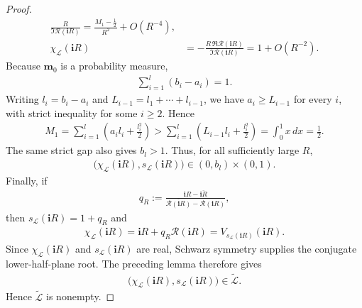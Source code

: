 \documentclass[11pt]{amsart}
\theoremstyle{plain}
\renewcommand\ell{l}
\newcommand\bm{\mathbf{m}}
\numberwithin{equation}{section}
\numberwithin{theorem}{section}
\numberwithin{figure}{section}
\begin{document}
\begin{proof}
\begin{align*}
    \frac{R}{\Im\mathscr R(\mathbf iR)}
    =
    \frac{M_1-\frac12}{R^2}+O(R^{-4}),\\
    \chi_{\mathcal L}(\mathbf iR)
    &=
    -\frac{R\,\Re\mathscr R(\mathbf iR)}
          {\Im\mathscr R(\mathbf iR)}
    =
    1+O(R^{-2}).
\end{align*}
Because $\bm_0$ is a probability measure,
\begin{align*}
    \sum_{i=1}^{l}(b_i-a_i)=1.
\end{align*}
Writing $\ell_i=b_i-a_i$ and
$L_{i-1}=\ell_1+\cdots+\ell_{i-1}$, we have
$a_i\geq L_{i-1}$ for every $i$, with strict inequality for some
$i\geq2$. Hence
\begin{align*}
    M_1
    =
    \sum_{i=1}^{l}
    \left(a_i\ell_i+\frac{\ell_i^2}{2}\right)
    >
    \sum_{i=1}^{l}
    \left(L_{i-1}\ell_i+\frac{\ell_i^2}{2}\right)
    =
    \int_0^1x\,dx
    =
    \frac12.
\end{align*}
The same strict gap also gives $b_l>1$. Thus, for all sufficiently
large $R$,
\begin{align*}
    \bigl(
        \chi_{\mathcal L}(\mathbf iR),
        s_{\mathcal L}(\mathbf iR)
    \bigr)
    \in
    (0,b_l)\times(0,1).
\end{align*}
Finally, if
\begin{align*}
    q_R
    :=
    \frac{\mathbf iR-\overline{\mathbf iR}}
         {\overline{\mathscr R(\mathbf iR)}-\mathscr R(\mathbf iR)},
\end{align*}
then $s_{\mathcal L}(\mathbf iR)=1+q_R$ and
\begin{align*}
    \chi_{\mathcal L}(\mathbf iR)
    =
    \mathbf iR+q_R\mathscr R(\mathbf iR)
    =
    V_{s_{\mathcal L}(\mathbf iR)}(\mathbf iR).
\end{align*}
Since $\chi_{\mathcal L}(\mathbf iR)$ and
$s_{\mathcal L}(\mathbf iR)$ are real, Schwarz symmetry supplies the
conjugate lower-half-plane root.  The preceding lemma therefore gives
\begin{align*}
    \bigl(
        \chi_{\mathcal L}(\mathbf iR),
        s_{\mathcal L}(\mathbf iR)
    \bigr)
    \in\widetilde{\mathcal L}.
\end{align*}
Hence $\widetilde{\mathcal L}$ is nonempty.


\end{proof}
\end{document}
